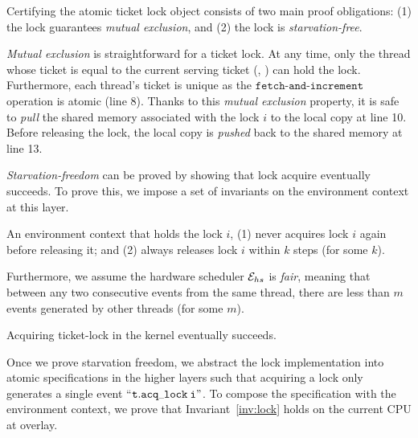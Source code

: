 Certifying the atomic ticket lock object consists of two main proof obligations:
(1) the lock guarantees \emph{mutual exclusion}, and (2) the lock  
is \emph{starvation-free}.

\emph{Mutual exclusion}
is straightforward for a ticket lock.
At any time, only the thread whose ticket is equal to
the current serving ticket (\ie, )
can hold the lock. 
Furthermore, each thread's ticket is unique
as the $\texttt{fetch-and-increment}$ operation is atomic
(line 8). 
Thanks to this \emph{mutual exclusion} property,
it is safe to \emph{pull} the shared memory associated with
the lock $i$ to the local copy
at line 10.
Before releasing the lock, the local copy is \emph{pushed}
back to the shared memory at line 13.

\emph{Starvation-freedom} can be proved
by showing that lock acquire eventually succeeds.
To prove this, we impose a set of invariants on the environment
context at this layer.

\vspace{-3pt}
\begin{invariant}
\label{inv:lock}
An environment context that holds the lock $i$,
(1) never acquires lock $i$ again before releasing it;
and (2) always releases lock $i$ within $k$ steps
(for some $k$).
\end{invariant}
Furthermore, we assume the hardware scheduler $\mathcal{E}_{hs}$ is \emph{fair},
meaning that between any two consecutive events from the same thread,
there are less than $m$ events generated by other threads (for some $m$).

\vspace{-3pt}
\begin{lemma}
\label{lemma:lock}
Acquiring ticket-lock in the {\mCTOS} kernel eventually succeeds.
\end{lemma}
Once we prove starvation freedom,
we abstract the lock implementation into atomic specifications in
the higher layers such that acquiring a lock only generates a single
event ``${\tiny \mathtt{t.acq\_lock\ i}}"$. To compose the specification with
the environment context, we prove that Invariant~\ref{inv:lock}
holds on the current CPU at overlay.

